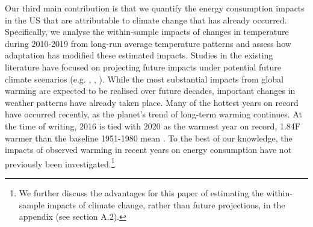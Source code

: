 \documentclass[11pt]{article}
\begin{document}


Our third main contribution is that we quantify the energy consumption impacts in the US that are attributable to climate change that has already occurred. Specifically, we analyse the within-sample impacts of changes in temperature during 2010-2019 from long-run average temperature patterns and assess how adaptation has modified these estimated impacts. Studies in the existing literature have focused on projecting future impacts under potential future climate scenarios (e.g. \cite{Green2011}, \cite{Rode2021}, \cite{auffhammer2022climate}). While the most substantial impacts from global warming are expected to be realised over future decades, important changes in weather patterns have already taken place. Many of the hottest years on record have occurred recently, as the planet's trend of long-term warming continues. At the time of writing, 2016 is tied with 2020 as the warmest year on record, 1.84\degree F warmer than the baseline 1951-1980 mean \citep{NASA2021}. To the best of our knowledge, the impacts of observed warming in recent years on energy consumption have not previously been investigated.\footnote{ We further discuss the advantages for this paper of estimating the within-sample impacts of climate change, rather than future projections, in the appendix (see section A.2).}
\end{document}

